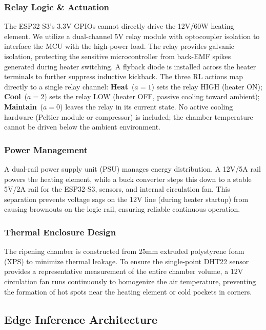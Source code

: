 \documentclass[conference]{IEEEtran}
\begin{document}
    \subsubsection{Relay Logic \& Actuation}
    The ESP32-S3's 3.3V GPIOs cannot directly drive the 12V/60W heating element. We utilize a dual-channel 5V relay module with optocoupler isolation to interface the MCU with the high-power load. The relay provides galvanic isolation, protecting the sensitive microcontroller from back-EMF spikes generated during heater switching. A flyback diode is installed across the heater terminals to further suppress inductive kickback.  The three RL actions map directly to a single relay channel: \textbf{Heat}~($a{=}1$) sets the relay HIGH (heater ON); \textbf{Cool}~($a{=}2$) sets the relay LOW (heater OFF, passive cooling toward ambient); \textbf{Maintain}~($a{=}0$) leaves the relay in its current state.  No active cooling hardware (Peltier module or compressor) is included; the chamber temperature cannot be driven below the ambient environment.

    \subsubsection{Power Management}
    A dual-rail power supply unit (PSU) manages energy distribution. A 12V/5A rail powers the heating element, while a buck converter steps this down to a stable 5V/2A rail for the ESP32-S3, sensors, and internal circulation fan. This separation prevents voltage sags on the 12V line (during heater startup) from causing brownouts on the logic rail, ensuring reliable continuous operation.

    \subsubsection{Thermal Enclosure Design}
    The ripening chamber is constructed from 25mm extruded polystyrene foam (XPS) to minimize thermal leakage. To ensure the single-point DHT22 sensor provides a representative measurement of the entire chamber volume, a 12V circulation fan runs continuously to homogenize the air temperature, preventing the formation of hot spots near the heating element or cold pockets in corners.

    \subsection{Edge Inference Architecture}
\end{document}
